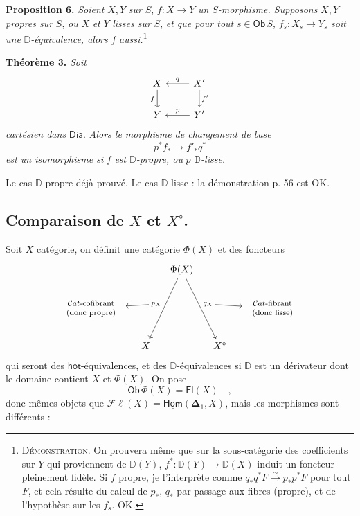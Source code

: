 \documentclass[11pt]{article}
\newcommand{\printedpage}[1]{\marginpar{\footnotesize p.~#1}}
\newcommand{\msp}[1]{\marginpar{\footnotesize [#1]}}
\newcommand{\D}{\mathbb{D}}
\newcommand{\Dia}{\mathsf{Dia}}
\newcommand{\Ob}{\mathsf{Ob}}
\newcommand{\Fl}{\mathsf{Fl}}
\newcommand{\Hom}{\underline{\mathsf{Hom}}}
\newcommand{\hot}{\mathsf{hot}}
\newcommand{\Cat}{\mathcal{C}at}
\begin{document}
\noindent\textbf{Proposition 6.} \textit{Soient} $X, Y$ \textit{sur} $S$, $f : X \to Y$ \textit{un} $S$\textit{-morphisme. Supposons} $X, Y$ \textit{propres sur} $S$, \textit{ou} $X$ \textit{et} $Y$ \textit{lisses sur} $S$, \textit{et que pour tout} $s \in \Ob\, S$, $f_s : X_s \to Y_s$ \textit{soit une} $\D$\textit{-équivalence, alors} $f$ \textit{aussi.}\footnote[32]{\textsc{Démonstration}. On prouvera même que sur la sous-catégorie des coefficients sur $Y$ qui proviennent de $\D(Y)$, $f^* : \D(Y) \to \D(X)$ induit un foncteur pleinement fidèle. Si $f$ propre, je l'interprète comme $q_*q^*F \overset{\sim}{\to} p_*p^*F$ pour tout $F$, et cela résulte du calcul de $p_*$, $q_*$ par passage aux fibres (propre), et de l'hypothèse sur les $f_s$. OK.}

\msp{page 72}

\noindent\textbf{Théorème 3.} \textit{Soit}
\[
\begin{tikzcd}
X \arrow[d, "f"{swap}] & X' \arrow[l, "q"{swap}] \arrow[d, "f'"] \\
Y & Y' \arrow[l, "p"{swap}]
\end{tikzcd}
\]
\textit{cartésien dans} $\Dia$. \textit{Alors le morphisme de changement de base}
\[
p^*f_* \longrightarrow f'_*q^*
\]
\textit{est un isomorphisme si} $f$ \textit{est} $\D$\textit{-propre, ou} $p$ $\D$\textit{-lisse.}

\noindent Le cas $\D$-propre déjà prouvé. Le cas $\D$-lisse : la démonstration p. 56 est OK.

\printedpage{43}

\subsection*{Comparaison de $X$ et $X^{\circ}$.}

Soit $X$ catégorie, on définit une catégorie $\Phi(X)$ et des foncteurs
\[
\begin{tikzcd}[column sep=small]
& & \Phi(X) \arrow[ddl, "p_X"{swap, name=P}] \arrow[ddr, "q_X"{name=Q}] & & \\
|[alias=L]| \text{\footnotesize\begin{tabular}{c}$\Cat$-cofibrant\\(donc propre)\end{tabular}} & & & & |[alias=R]| \text{\footnotesize\begin{tabular}{c}$\Cat$-fibrant\\(donc lisse)\\ \end{tabular}} \\
& X & & X^{\circ} &
\arrow[from=P, to=L]
\arrow[from=Q, to=R]
\end{tikzcd}
\]
qui seront des $\hot$-équivalences, et des $\D$-équivalences si $\D$ est un dérivateur dont le domaine contient $X$ et $\Phi(X)$. On pose
\[
\Ob\, \Phi(X) = \Fl(X) \quad ,
\]
donc mêmes objets que $\mathcal{F}\ell(X) = \Hom(\boldsymbol{\Delta}_1, X)$, mais les morphismes sont différents :
\end{document}
